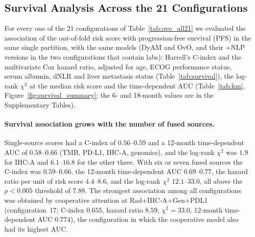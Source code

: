
\subsection{Survival Analysis Across the 21 Configurations}
\label{sec:survival}

For every one of the 21 configurations of Table~\ref{tab:ovo_all21} we evaluated the association of the out-of-fold risk score with
progression-free survival (PFS) in the same single partition, with the same models (DyAM and OvO, and their +NLP versions in the two
configurations that contain labs): Harrell's C-index and the multivariate Cox hazard ratio, adjusted for age, ECOG performance status,
serum albumin, dNLR and liver metastasis status (Table~\ref{tab:survival}), the log-rank $\chi^2$ at the median risk score and the
time-dependent AUC (Table~\ref{tab:km}, Figure~\ref{fig:survival_summary}; the 6- and 18-month values are in the Supplementary Tables).

\paragraph{Survival association grows with the number of fused sources.}
Single-source scores had a C-index of $0.56$--$0.59$ and a 12-month time-dependent AUC of $0.58$--$0.66$ (TMB, PD-L1, IHC-A, genomics),
and the log-rank $\chi^2$ was $1.9$ for IHC-A and $6.1$--$16.8$ for the other three.
With six or seven fused sources the C-index was $0.59$--$0.66$, the 12-month time-dependent AUC $0.69$--$0.77$, the hazard ratio per unit of
risk score $4.4$--$8.6$, and the log-rank $\chi^2$ $12.1$--$33.0$, all above the $p < 0.005$ threshold of $7.88$.
The strongest association among all configurations was obtained by cooperative attention at Rad+IHC-A+Gen+PDL1 (configuration~17;
C-index $0.655$, hazard ratio $8.59$, $\chi^2 = 33.0$, 12-month time-dependent AUC $0.774$), the configuration in which the
cooperative model also had its highest AUC.

